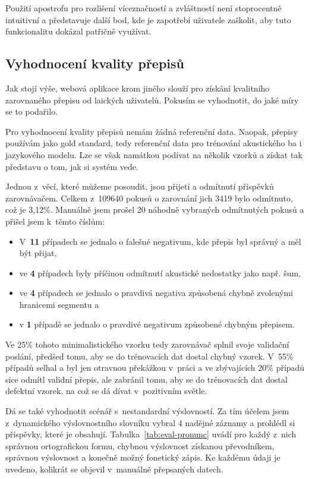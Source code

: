 Použití apostrofu pro rozlišení víceznačností a zvláštností není stoprocentně
intuitivní a představuje další bod, kde je zapotřebí uživatele zaškolit, aby
tuto funkcionalitu dokázal patřičně využívat.

\subsection{Vyhodnocení kvality přepisů}

Jak stojí výše, webová aplikace krom jiného slouží pro získání kvalitního
zarovnaného přepisu od laických uživatelů. Pokusím se vyhodnotit, do jaké míry
se to podařilo.

Pro vyhodnocení kvality přepisů nemám žádná referenční data. Naopak, přepisy
používám jako gold standard, tedy referenční data pro trénování akustického ba i
jazykového modelu. Lze se však namátkou podívat na několik vzorků a získat tak
představu o tom, jak si systém vede.

Jednou z~věcí, které můžeme posoudit, jsou přijetí a odmítnutí příspěvků
zarovnávačem. Celkem z~109640 pokusů o zarovnání jich 3419 bylo odmítnuto, což
je 3,12\%. Manuálně jsem prošel 20 náhodně vybraných odmítnutých pokusů a
přišel jsem k~těmto číslům:
\begin{itemize}
\item{
    V~\textbf{11} případech se jednalo o falešné negativum, kde přepis byl
    správný a měl být přijat,
}
\item{
    ve \textbf{4} případech byly příčinou odmítnutí akustické nedostatky jako
    např. šum,
}
\item{
    ve \textbf{4} případech se jednalo o pravdivá negativa způsobená chybně
    zvolenými hranicemi segmentu a
}
\item{
     v \textbf{1} případě se jednalo o pravdivé negativum způsobené chybným
    přepisem.
}
\end{itemize}

Ve 25\% tohoto minimalistického vzorku tedy zarovnávač splnil svoje validační
poslání, předšed tomu, aby se do trénovacích dat dostal chybný vzorek. V~55\%
případů selhal a byl jen otravnou překážkou v~práci a ve zbývajících 20\%
případů sice odmítl validní přepis, ale zabránil tomu, aby se do trénovacích dat
dostal defektní vzorek, na což se dá dívat v~pozitivním světle.

Dá se také vyhodnotit scénář s~nestandardní výslovností. Za tím účelem jsem
z~dynamického výslovnostního slovníku vybral 4 nadějné záznamy a prohlédl si
příspěvky, které je obsahují. Tabulka~\ref{tab:eval-pronunc} uvádí pro každý
z~nich správnou ortografickou formu, chybnou výslovnost získanou převodníkem,
správnou výslovnost a konečně možný fonetický zápis. Ke každému údaji je uvedeno,
kolikrát se objevil v~manuálně přepsaných datech.

